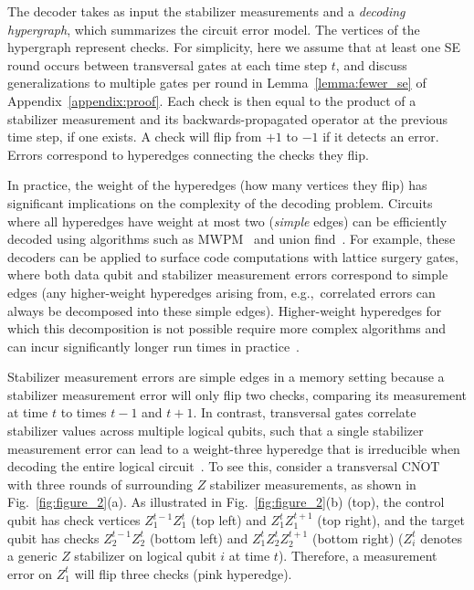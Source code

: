 \documentclass[prx,twocolumn,secnumarabic,balancelastpage,amsmath,amssymb,longbibliography]{revtex4-2}
\newcommand{\lcnot}{\overline{\text{CNOT}}}
\begin{document}
The decoder takes as input the stabilizer measurements and a \textit{decoding hypergraph}, which summarizes the circuit error model. 
%
The vertices of the hypergraph represent checks.
%
For simplicity, here we assume that at least one SE round occurs between transversal gates at each time step $t$, and discuss generalizations to multiple gates per round in Lemma~\ref{lemma:fewer_se} of Appendix~\ref{appendix:proof}.
%
Each check is then equal to the product of a stabilizer measurement and its backwards-propagated operator at the previous time step, if one exists. 
%
A check will flip from $+1$ to $-1$ if it detects an error.
%
Errors correspond to hyperedges connecting the checks they flip.

In practice, the weight of the hyperedges (how many vertices they flip) has significant implications on the complexity of the decoding problem. 
%
Circuits where all hyperedges have weight at most two (\textit{simple} edges) can be efficiently decoded using algorithms such as MWPM~\cite{dennis2002topological,higgott2025sparse,wu2023fusion} and union find~\cite{delfosse2017almost}. 
%
For example, these decoders can be applied to surface code computations with lattice surgery gates, where both data qubit and stabilizer measurement errors correspond to simple edges (any higher-weight hyperedges arising from, e.g.,~correlated errors can always be decomposed into these simple edges).
%
Higher-weight hyperedges for which this decomposition is not possible require more complex algorithms and can incur significantly longer run times in practice~\cite{panteleev2019degenerate,roffe2020decoding,delfosse2022toward,cain2024correlated,wu2024hypergraph}.

Stabilizer measurement errors are simple edges in a memory setting because a stabilizer measurement error will only flip two checks, comparing its measurement at time $t$ to times $t-1$ and $t+1$.
% 
In contrast, transversal gates correlate stabilizer values across multiple logical qubits, such that a single stabilizer measurement error can lead to a weight-three hyperedge that is irreducible when decoding the entire logical circuit~\cite{cain2024correlated}.
%
To see this, consider a transversal $\lcnot$ with three rounds of surrounding $Z$ stabilizer measurements, as shown in Fig.~\ref{fig:figure_2}(a).
%
As illustrated in Fig.~\ref{fig:figure_2}(b) (top), the control qubit has check vertices $Z_1^{t-1}Z_1^{t}$ (top left) and $Z_1^{t}Z_1^{t+1}$ (top right), and the target qubit has checks $Z_2^{t-1}Z_2^{t}$ (bottom left) and $Z_1^{t}Z_2^{t}Z_2^{t+1}$ (bottom right) ($Z_i^{t}$ denotes a generic $Z$ stabilizer on logical qubit $i$ at time $t$).
%
Therefore, a measurement error on $Z_1^{t}$ will flip three checks (pink hyperedge). 
\end{document}
